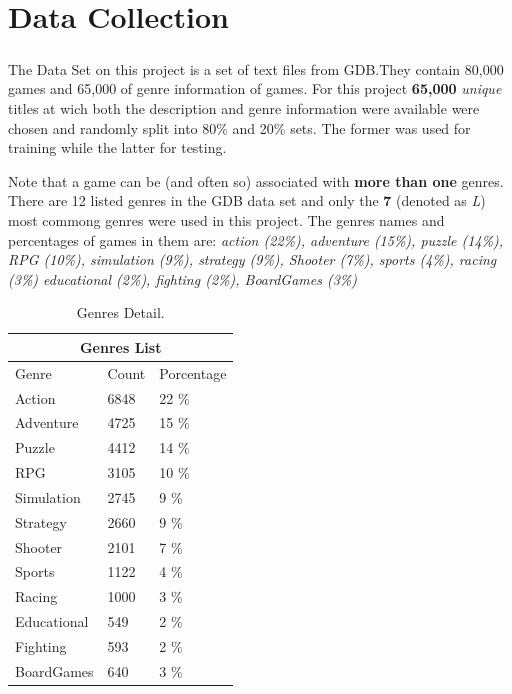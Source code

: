 \documentclass{book}
\begin{document}
    \chapter{Data Collection}
    \paragraph{}

    The Data Set on this project is a set of text files from GDB.They contain 80,000 games and 65,000 of genre information of games. For this project \textbf{65,000} \textit{unique} titles at wich both the description and genre information were available were chosen and randomly split into 80\% and 20\% sets. The former was used for training while the latter for testing.

    Note that a game can be (and often so) associated with \textbf{more than one} genres. There are 12 listed genres in the GDB data set and only the \textbf{7} (denoted as \textit{L}) most commong genres were used in this project. The genres names and percentages of games in them are: \textit{action (22\%), adventure (15\%), puzzle (14\%), RPG (10\%), simulation (9\%), strategy (9\%), Shooter (7\%), sports (4\%), racing (3\%) educational (2\%), fighting (2\%), BoardGames (3\%)}
    \begin{table}[H]\label{tab:genre}
        \centering
        \begin{tabular}{|p{3cm}|p{3cm}|p{3cm}|}
            \hline
            \multicolumn{3}{|c|}{Genres List} \\
            \hline
                    Genre & Count & Porcentage \\
            \hline
                    Action & 6848 & 22 \% \\
                Adventure & 4725 & 15 \% \\
                    Puzzle & 4412 & 14 \% \\
                        RPG & 3105 & 10 \% \\
                Simulation & 2745 & 9 \% \\
                Strategy & 2660 & 9 \% \\
                    Shooter & 2101 & 7 \% \\
                    Sports & 1122 & 4 \% \\
                    Racing & 1000 & 3 \% \\
                Educational & 549 & 2 \% \\
                Fighting & 593 & 2 \% \\
                BoardGames & 640 & 3 \% \\
            \hline 
        \end{tabular}
        \caption{Genres Detail.}
    \end{table}
\end{document}
